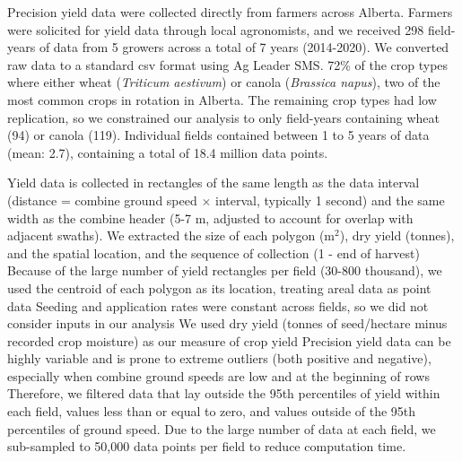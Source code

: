 \documentclass[]{elsarticle} %
\begin{document}
Precision yield data were collected directly from farmers across Alberta.
Farmers were solicited for yield data through local agronomists, and we received 298 field-years of data from 5 growers across a total of 7 years (2014-2020).
We converted raw data to a standard csv format using Ag Leader SMS.
72\% of the crop types where either wheat (\emph{Triticum aestivum}) or canola (\emph{Brassica napus}), two of the most common crops in rotation in Alberta.
The remaining crop types had low replication, so we constrained our analysis to only field-years containing wheat (94) or canola (119).
Individual fields contained between 1 to 5 years of data (mean: 2.7), containing a total of 18.4 million data points.

Yield data is collected in rectangles of the same length as the data interval (distance = combine ground speed \(\times\) interval, typically 1 second) and the same width as the combine header (5-7 m, adjusted to account for overlap with adjacent swaths).
We extracted the size of each polygon (m\(^2\)), dry yield (tonnes), and the spatial location, and the sequence of collection (1 - end of harvest)
Because of the large number of yield rectangles per field (30-800 thousand), we used the centroid of each polygon as its location, treating areal data as point data
Seeding and application rates were constant across fields, so we did not consider inputs in our analysis
We used dry yield (tonnes of seed/hectare minus recorded crop moisture) as our measure of crop yield
Precision yield data can be highly variable and is prone to extreme outliers (both positive and negative), especially when combine ground speeds are low and at the beginning of rows
Therefore, we filtered data that lay outside the 95th percentiles of yield within each field, values less than or equal to zero, and values outside of the 95th percentiles of ground speed.
Due to the large number of data at each field, we sub-sampled to 50,000 data points per field to reduce computation time.
\end{document}
